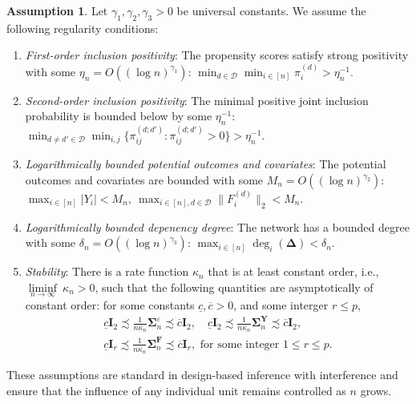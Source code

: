 \documentclass[twoside]{article}
\theoremstyle{plain}
\theoremstyle{definition}
\newtheorem{assumption}[theorem]{Assumption}
\theoremstyle{remark}
\newcommand{\bY}{\boldsymbol{Y}}
\newcommand{\bF}{\boldsymbol{F}}
\newcommand{\bI}{\boldsymbol{I}}
\newcommand{\bSigma}{\boldsymbol{\Sigma}}
\newcommand{\bDelta}{\boldsymbol{\Delta}}
\newcommand{\cD}{\mathcal{D}}
\begin{document}
\begin{assumption}
    Let $\gamma_1, \gamma_2, \gamma_3 > 0$ be universal constants. We assume the following regularity conditions:
    \begin{enumerate}[label=(\alph*), ref=\theassumption (\alph*)]
        \item \label{asp::positivity_a} \textit{  First-order inclusion positivity}: The propensity scores satisfy strong positivity with some  $\eta_n = O((\log n)^{\gamma_1})$: $
        \min_{d\in\cD} \min_{i\in[n]} \pi_i^{(d)} > \eta_n^{-1}$.

        \item \label{asp::positivity_b} \textit{Second-order inclusion positivity}: The minimal positive joint inclusion probability is bounded below by some $\eta_n^{-1}$: $\min_{d\neq d'\in\cD} \min_{i,j} \{\pi_{ij}^{(d;d')}: \pi_{ij}^{(d;d')} > 0\} > \eta_n^{-1}$.

        \item \label{asp::bound} \textit{Logarithmically bounded potential outcomes and covariates}: The potential outcomes and covariates are bounded with some $M_n = O((\log n)^{\gamma_2})$: $\max_{i\in[n]} |Y_i| < M_n, ~ \max_{i\in[n], d\in\cD} \|F_i^{(d)}\|_2 < M_n$.

        \item \label{asp::bounded_degree} \textit{Logarithmically bounded depenency degree}: The network has a bounded degree with some $\delta_n = O((\log n)^{\gamma_3})$: $\max_{i\in[n]} \deg_i(\bDelta) < \delta_n$.

        \item \label{asp::stability} \textit{Stability}:
        There is a rate function $\kappa_n$ that is at least constant order, i.e., $ \underset{n\to\infty}{\liminf} ~\kappa_n > 0$, such that the following quantities are asymptotically of constant order: for some constants $\underline{c}, \overline{c} > 0$, and some interger $r \le p$,
        \begin{gather*}
            \underline{c}\bI_2\precsim\frac{1}{n\kappa_n}\bSigma^{\varepsilon}_n \precsim \overline{c}\bI_2, \quad \underline{c}\bI_2\precsim\frac{1}{n\kappa_n}\bSigma^{\bY}_n \precsim \overline{c}\bI_2, \\ \underline{c}\bI_r\precsim\frac{1}{n\kappa_n}\bSigma^{\bF}_n \precsim \overline{c}\bI_r, \text{ for some integer } 1 \le r \le p .
        \end{gather*}
    \end{enumerate}
\end{assumption}
These assumptions are standard in design-based inference with interference and ensure that the influence of any individual unit remains controlled as $n$ grows.
\end{document}
